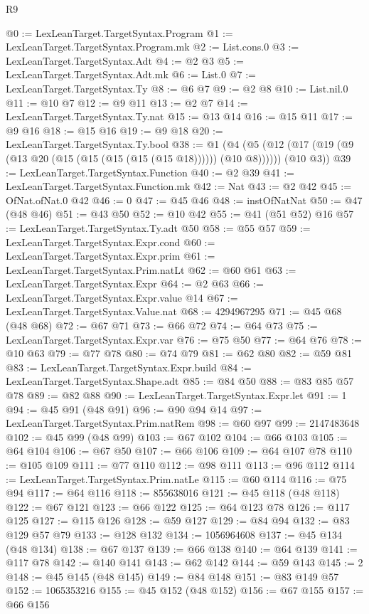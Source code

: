 \begin{lexlean}{R9}
\begin{coremodule}
@0 := LexLeanTarget.TargetSyntax.Program
@1 := LexLeanTarget.TargetSyntax.Program.mk
@2 := List.cons.{0}
@3 := LexLeanTarget.TargetSyntax.Adt
@4 := @2 @3
@5 := LexLeanTarget.TargetSyntax.Adt.mk
@6 := List.{0}
@7 := LexLeanTarget.TargetSyntax.Ty
@8 := @6 @7
@9 := @2 @8
@10 := List.nil.{0}
@11 := @10 @7
@12 := @9 @11
@13 := @2 @7
@14 := LexLeanTarget.TargetSyntax.Ty.nat
@15 := @13 @14
@16 := @15 @11
@17 := @9 @16
@18 := @15 @16
@19 := @9 @18
@20 := LexLeanTarget.TargetSyntax.Ty.bool
@38 := @1
    (@4 (@5 (@12 (@17 (@19 (@9 (@13 @20 (@15 (@15 (@15 (@15 (@15 @18)))))) (@10 @8)))))) (@10 @3))
@39 := LexLeanTarget.TargetSyntax.Function
@40 := @2 @39
@41 := LexLeanTarget.TargetSyntax.Function.mk
@42 := Nat
@43 := @2 @42
@45 := OfNat.ofNat.{0} @42
@46 := 0
@47 := @45 @46
@48 := instOfNatNat
@50 := @47 (@48 @46)
@51 := @43 @50
@52 := @10 @42
@55 := @41 (@51 @52) @16
@57 := LexLeanTarget.TargetSyntax.Ty.adt @50
@58 := @55 @57
@59 := LexLeanTarget.TargetSyntax.Expr.cond
@60 := LexLeanTarget.TargetSyntax.Expr.prim
@61 := LexLeanTarget.TargetSyntax.Prim.natLt
@62 := @60 @61
@63 := LexLeanTarget.TargetSyntax.Expr
@64 := @2 @63
@66 := LexLeanTarget.TargetSyntax.Expr.value @14
@67 := LexLeanTarget.TargetSyntax.Value.nat
@68 := 4294967295
@71 := @45 @68 (@48 @68)
@72 := @67 @71
@73 := @66 @72
@74 := @64 @73
@75 := LexLeanTarget.TargetSyntax.Expr.var
@76 := @75 @50
@77 := @64 @76
@78 := @10 @63
@79 := @77 @78
@80 := @74 @79
@81 := @62 @80
@82 := @59 @81
@83 := LexLeanTarget.TargetSyntax.Expr.build
@84 := LexLeanTarget.TargetSyntax.Shape.adt
@85 := @84 @50
@88 := @83 @85 @57 @78
@89 := @82 @88
@90 := LexLeanTarget.TargetSyntax.Expr.let
@91 := 1
@94 := @45 @91 (@48 @91)
@96 := @90 @94 @14
@97 := LexLeanTarget.TargetSyntax.Prim.natRem
@98 := @60 @97
@99 := 2147483648
@102 := @45 @99 (@48 @99)
@103 := @67 @102
@104 := @66 @103
@105 := @64 @104
@106 := @67 @50
@107 := @66 @106
@109 := @64 @107 @78
@110 := @105 @109
@111 := @77 @110
@112 := @98 @111
@113 := @96 @112
@114 := LexLeanTarget.TargetSyntax.Prim.natLe
@115 := @60 @114
@116 := @75 @94
@117 := @64 @116
@118 := 855638016
@121 := @45 @118 (@48 @118)
@122 := @67 @121
@123 := @66 @122
@125 := @64 @123 @78
@126 := @117 @125
@127 := @115 @126
@128 := @59 @127
@129 := @84 @94
@132 := @83 @129 @57 @79
@133 := @128 @132
@134 := 1056964608
@137 := @45 @134 (@48 @134)
@138 := @67 @137
@139 := @66 @138
@140 := @64 @139
@141 := @117 @78
@142 := @140 @141
@143 := @62 @142
@144 := @59 @143
@145 := 2
@148 := @45 @145 (@48 @145)
@149 := @84 @148
@151 := @83 @149 @57
@152 := 1065353216
@155 := @45 @152 (@48 @152)
@156 := @67 @155
@157 := @66 @156

\end{coremodule}
\end{lexlean}
